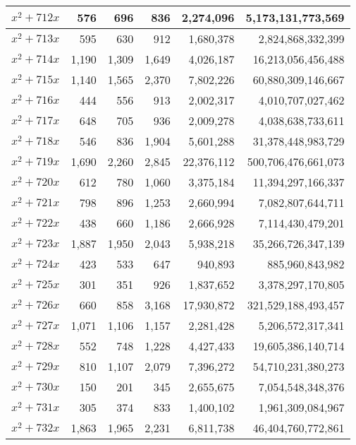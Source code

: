 \documentclass[a4paper]{amsproc}
\theoremstyle{plain}
\theoremstyle{named}
\begin{document}
\begin{longtable}{ | l | r | r | r | r | r | }
$x^2 + 712x$ & 576 & 696 & 836 & 2{,}274{,}096 & 5{,}173{,}131{,}773{,}569 \\ \hline
$x^2 + 713x$ & 595 & 630 & 912 & 1{,}680{,}378 & 2{,}824{,}868{,}332{,}399 \\ \hline
$x^2 + 714x$ & 1{,}190 & 1{,}309 & 1{,}649 & 4{,}026{,}187 & 16{,}213{,}056{,}456{,}488 \\ \hline
$x^2 + 715x$ & 1{,}140 & 1{,}565 & 2{,}370 & 7{,}802{,}226 & 60{,}880{,}309{,}146{,}667 \\ \hline
$x^2 + 716x$ & 444 & 556 & 913 & 2{,}002{,}317 & 4{,}010{,}707{,}027{,}462 \\ \hline
$x^2 + 717x$ & 648 & 705 & 936 & 2{,}009{,}278 & 4{,}038{,}638{,}733{,}611 \\ \hline
$x^2 + 718x$ & 546 & 836 & 1{,}904 & 5{,}601{,}288 & 31{,}378{,}448{,}983{,}729 \\ \hline
$x^2 + 719x$ & 1{,}690 & 2{,}260 & 2{,}845 & 22{,}376{,}112 & 500{,}706{,}476{,}661{,}073 \\ \hline
$x^2 + 720x$ & 612 & 780 & 1{,}060 & 3{,}375{,}184 & 11{,}394{,}297{,}166{,}337 \\ \hline
$x^2 + 721x$ & 798 & 896 & 1{,}253 & 2{,}660{,}994 & 7{,}082{,}807{,}644{,}711 \\ \hline
$x^2 + 722x$ & 438 & 660 & 1{,}186 & 2{,}666{,}928 & 7{,}114{,}430{,}479{,}201 \\ \hline
$x^2 + 723x$ & 1{,}887 & 1{,}950 & 2{,}043 & 5{,}938{,}218 & 35{,}266{,}726{,}347{,}139 \\ \hline
$x^2 + 724x$ & 423 & 533 & 647 & 940{,}893 & 885{,}960{,}843{,}982 \\ \hline
$x^2 + 725x$ & 301 & 351 & 926 & 1{,}837{,}652 & 3{,}378{,}297{,}170{,}805 \\ \hline
$x^2 + 726x$ & 660 & 858 & 3{,}168 & 17{,}930{,}872 & 321{,}529{,}188{,}493{,}457 \\ \hline
$x^2 + 727x$ & 1{,}071 & 1{,}106 & 1{,}157 & 2{,}281{,}428 & 5{,}206{,}572{,}317{,}341 \\ \hline
$x^2 + 728x$ & 552 & 748 & 1{,}228 & 4{,}427{,}433 & 19{,}605{,}386{,}140{,}714 \\ \hline
$x^2 + 729x$ & 810 & 1{,}107 & 2{,}079 & 7{,}396{,}272 & 54{,}710{,}231{,}380{,}273 \\ \hline
$x^2 + 730x$ & 150 & 201 & 345 & 2{,}655{,}675 & 7{,}054{,}548{,}348{,}376 \\ \hline
$x^2 + 731x$ & 305 & 374 & 833 & 1{,}400{,}102 & 1{,}961{,}309{,}084{,}967 \\ \hline
$x^2 + 732x$ & 1{,}863 & 1{,}965 & 2{,}231 & 6{,}811{,}738 & 46{,}404{,}760{,}772{,}861 \\ \hline

\end{longtable}
\end{document}

